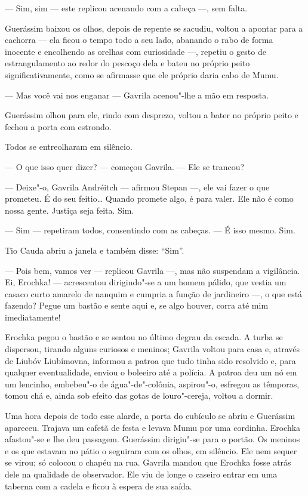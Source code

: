 --- Sim, sim --- este replicou acenando com a cabeça ---, sem falta.

Guerássim baixou os olhos, depois de repente se sacudiu, voltou a
apontar para a cachorra --- ela ficou o tempo todo a seu lado, abanando o rabo
de forma inocente e encolhendo as orelhas com curiosidade ---, repetiu o
gesto de estrangulamento ao redor do pescoço dela e bateu no próprio
peito significativamente, como se afirmasse que ele próprio daria cabo
de Mumu.

--- Mas você vai nos enganar --- Gavrila acenou"-lhe a mão em resposta.

Guerássim olhou para ele, rindo com desprezo, voltou a bater no próprio
peito e fechou a porta com estrondo.

Todos se entreolharam em silêncio.

--- O que isso quer dizer? --- começou Gavrila. --- Ele se trancou?

--- Deixe"-o, Gavrila Andréitch --- afirmou Stepan ---, ele vai fazer o
que prometeu. É do seu feitio\ldots{} Quando promete algo, é para valer. Ele
não é como nossa gente. Justiça seja feita. Sim.

--- Sim --- repetiram todos, consentindo com as cabeças. --- É isso
mesmo. Sim.

Tio Cauda abriu a janela e também disse: ``Sim''.

--- Pois bem, vamos ver --- replicou Gavrila ---, mas não suspendam a
vigilância. Ei, Erochka! --- acrescentou dirigindo"-se a um homem pálido,
que vestia um casaco curto amarelo de nanquim e cumpria a função de
jardineiro ---, o que está fazendo? Pegue um bastão e sente aqui e, se
algo houver, corra até mim imediatamente!

Erochka pegou o bastão e se sentou no último degrau da escada. A turba
se dispersou, tirando alguns curiosos e meninos; Gavrila voltou para
casa e, através de Liubóv Liubímovna, informou a patroa que tudo tinha
sido resolvido e, para qualquer eventualidade, enviou o boleeiro até a
polícia. A patroa deu um nó em um lencinho, embebeu"-o de
água"-de"-colônia, aspirou"-o, esfregou as têmporas, tomou chá e, ainda sob
efeito das gotas de louro"-cereja, voltou a dormir.

Uma hora depois de todo esse alarde, a porta do cubículo se abriu e
Guerássim apareceu. Trajava um cafetã de festa e levava Mumu por uma
cordinha. Erochka afastou"-se e lhe deu passagem. Guerássim dirigiu"-se
para o portão. Os meninos e os que estavam no pátio o seguiram com os
olhos, em silêncio. Ele nem sequer se virou; só colocou o chapéu na rua.
Gavrila mandou que Erochka fosse atrás dele na qualidade de observador.
Ele viu de longe o caseiro entrar em uma taberna com a cadela e ficou à
espera de sua saída.

